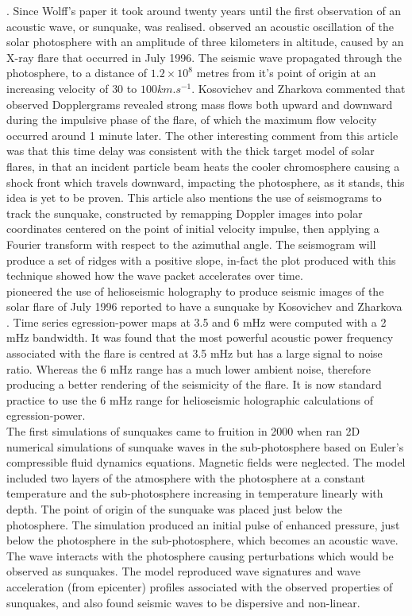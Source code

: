\documentclass[11pt]{article}
\begin{document}
\citep{1972ApJ...176..833W}. Since Wolff's paper it took around twenty years until the first observation of an acoustic wave, or sunquake, was realised. \cite{1998Natur.393..317K} observed an acoustic oscillation of the solar photosphere with an amplitude of three kilometers in altitude, caused by an X-ray flare that occurred in July 1996. The seismic wave propagated through the photosphere, to a distance of $1.2\times10^{8}$ metres from it's point of origin at an increasing velocity of $30$ to $100 km.s^{-1}$. Kosovichev and Zharkova commented that observed Dopplergrams revealed strong mass flows both upward and downward during the impulsive phase of the flare, of which the maximum flow velocity occurred around 1 minute later. The other interesting comment from this article was that this time delay was consistent with the thick target model of solar flares, in that an incident particle beam heats the cooler chromosphere causing a shock front which travels downward, impacting the photosphere, as it stands, this idea is yet to be proven. This article also mentions the use of seismograms to track the sunquake, constructed by remapping Doppler images into polar coordinates centered on the point of initial velocity impulse, then applying a Fourier transform with respect to the azimuthal angle. The seismogram will produce a set of ridges with a positive slope, in-fact the plot produced with this technique showed how the wave packet accelerates over time. \\


\cite{1999ApJ...513L.143D} pioneered the use of helioseismic holography to produce seismic images of the solar flare of July 1996 reported to have a sunquake by Kosovichev and Zharkova \citep{1998Natur.393..317K}. Time series egression-power maps at 3.5 and 6 mHz were computed with a 2 mHz bandwidth. It was found that the most powerful acoustic power frequency associated with the flare is centred at 3.5 mHz but has a large signal to noise ratio. Whereas the 6 mHz range has a much lower ambient noise, therefore producing a better rendering of the seismicity of the flare. It is now standard practice to use the 6 mHz range for helioseismic holographic calculations of egression-power. \\


The first simulations of sunquakes came to fruition in 2000 when \cite{2000AcA....50..405M} ran 2D numerical simulations of sunquake waves in the sub-photosphere based on Euler's compressible fluid dynamics equations. Magnetic fields were neglected. The model included two layers of the atmosphere with the photosphere at a constant temperature and the sub-photosphere increasing in temperature linearly with depth. The point of origin of the sunquake was placed just below the photosphere. The simulation produced an initial pulse of enhanced pressure, just below the photosphere in the sub-photosphere, which becomes an acoustic wave. The wave interacts with the photosphere causing perturbations which would be observed as sunquakes. The model reproduced wave signatures and wave acceleration (from epicenter) profiles associated with the observed properties of sunquakes, and also found seismic waves to be dispersive and non-linear.\\
\end{document}
